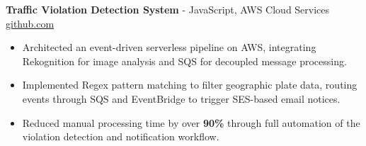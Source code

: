\documentclass[11pt]{article}       %
\begin{document}

\textbf{Traffic Violation Detection System}{ - JavaScript, AWS Cloud Services} \hfill \href{https://github.com/Monica20030707/AWS_rekonigition-N-read-database}{github.com} \\
\vspace{-9pt}
\begin{itemize}
  \item Architected an event-driven serverless pipeline on AWS, integrating Rekognition for image analysis and SQS for decoupled message processing.
  \item Implemented Regex pattern matching to filter geographic plate data, routing events through SQS and EventBridge to trigger SES-based email notices.
  \item Reduced manual processing time by over \textbf{90\%} through full automation of the violation detection and notification workflow.
\end{itemize}

\end{document}
